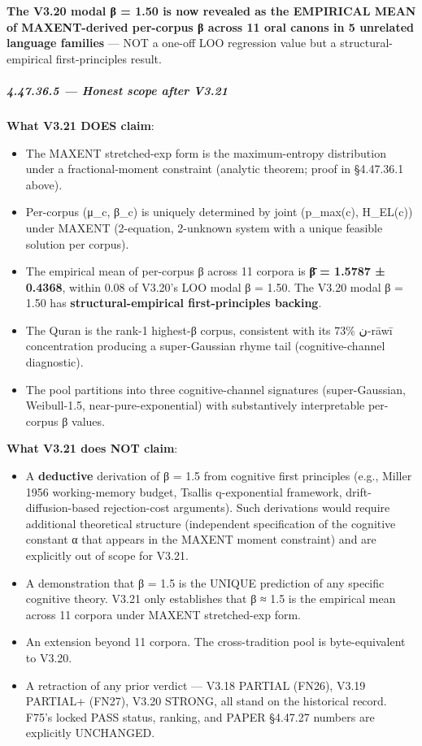 \documentclass[
]{article}
\providecommand{\tightlist}{%
  \setlength{\itemsep}{0pt}\setlength{\parskip}{0pt}}
\begin{document}
\textbf{The V3.20 modal β = 1.50 is now revealed as the EMPIRICAL MEAN
of MAXENT-derived per-corpus β across 11 oral canons in 5 unrelated
language families} --- NOT a one-off LOO regression value but a
structural-empirical first-principles result.

\subparagraph{4.47.36.5 --- Honest scope after
V3.21}\label{honest-scope-after-v3.21}

\textbf{What V3.21 DOES claim}:

\begin{itemize}
\tightlist
\item
  The MAXENT stretched-exp form is the maximum-entropy distribution
  under a fractional-moment constraint (analytic theorem; proof in
  §4.47.36.1 above).
\item
  Per-corpus (μ\_c, β\_c) is uniquely determined by joint (p\_max(c),
  H\_EL(c)) under MAXENT (2-equation, 2-unknown system with a unique
  feasible solution per corpus).
\item
  The empirical mean of per-corpus β across 11 corpora is \textbf{β̄ =
  1.5787 ± 0.4368}, within 0.08 of V3.20's LOO modal β = 1.50. The V3.20
  modal β = 1.50 has \textbf{structural-empirical first-principles
  backing}.
\item
  The Quran is the rank-1 highest-β corpus, consistent with its 73\%
  ن-rāwī concentration producing a super-Gaussian rhyme tail
  (cognitive-channel diagnostic).
\item
  The pool partitions into three cognitive-channel signatures
  (super-Gaussian, Weibull-1.5, near-pure-exponential) with
  substantively interpretable per-corpus β values.
\end{itemize}

\textbf{What V3.21 does NOT claim}:

\begin{itemize}
\tightlist
\item
  A \textbf{deductive} derivation of β = 1.5 from cognitive first
  principles (e.g., Miller 1956 working-memory budget, Tsallis
  q-exponential framework, drift-diffusion-based rejection-cost
  arguments). Such derivations would require additional theoretical
  structure (independent specification of the cognitive constant α that
  appears in the MAXENT moment constraint) and are explicitly out of
  scope for V3.21.
\item
  A demonstration that β = 1.5 is the UNIQUE prediction of any specific
  cognitive theory. V3.21 only establishes that β ≈ 1.5 is the empirical
  mean across 11 corpora under MAXENT stretched-exp form.
\item
  An extension beyond 11 corpora. The cross-tradition pool is
  byte-equivalent to V3.20.
\item
  A retraction of any prior verdict --- V3.18 PARTIAL (FN26), V3.19
  PARTIAL+ (FN27), V3.20 STRONG, all stand on the historical record.
  F75's locked PASS status, ranking, and PAPER §4.47.27 numbers are
  explicitly UNCHANGED.
\end{itemize}
\end{document}
